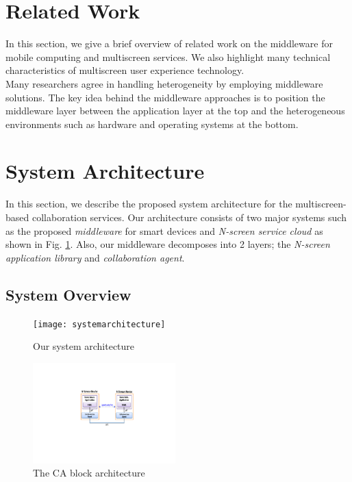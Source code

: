 \documentclass{sig-alternate}
\begin{document}
\section{Related Work}
\label{sc:RelatedWork}
In this section, we give a brief overview of related work on the middleware for mobile computing and multiscreen services.
    We also highlight many technical characteristics of multiscreen user experience technology.\\

Many researchers agree in handling heterogeneity by employing middleware solutions.
The key idea behind the middleware approaches is to position the middleware layer between the application layer at the top and the heterogeneous environments such as hardware and operating systems at the bottom. 

\section{System Architecture}
    \label{sc:Architecture}
    In this section, we describe the proposed system architecture for the multiscreen-based collaboration services.
    Our architecture consists of two major systems such as the proposed \textit{middleware} for smart devices and \textit{N-screen service cloud} as shown in Fig. \ref{fig:architecture}. Also, our middleware decomposes into 2 layers;  the \textit{N-screen application library} and \textit{collaboration agent}.  

\subsection{System Overview}

    \begin{figure}[htb] %
    \centering
    \texttt{[image: systemarchitecture]}
    \caption{Our system architecture}
    \label{fig:architecture}
    \end{figure}

    \begin{figure}[htb] %
    \centering
    \includegraphics[width=5.5cm,keepaspectratio]{basicmodel}
    \caption{The CA block architecture}
    \label{fig:basicmodel}
    \end{figure}
\end{document}
